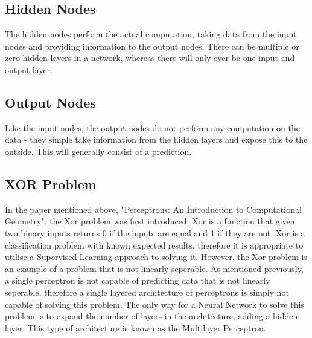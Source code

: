 \documentclass[12pt]{report}
\begin{document}
\subsection{Hidden Nodes}
\begin{flushleft}
The hidden nodes perform the actual computation, taking data from the input nodes and providing information to the output nodes. There can be multiple or zero hidden layers in a network, whereas there will only ever be one input and output layer.
\end{flushleft}

\subsection{Output Nodes}
\begin{flushleft}
Like the input nodes, the output nodes do not perform any computation on the data - they simple take information from the hidden layers and expose this to the outside. This will generally consist of a prediction.
\end{flushleft}

\subsection{XOR Problem}
\begin{flushleft}
In the paper mentioned above, "Perceptrons: An Introduction to Computational Geometry", the Xor problem was first introduced. Xor is a function that given two binary inputs returns 0 if the inputs are equal and 1 if they are not. Xor is a classification problem with known expected results, therefore it is appropriate to utilise a Supervised Learning approach to solving it. However, the Xor problem is an example of a problem that is not linearly seperable. As mentioned previously, a single perceptron is not capable of predicting data that is not linearly seperable, therefore a single layered architecture of perceptrons is simply not capable of solving this problem. The only way for a Neural Network to solve this problem is to expand the number of layers in the architecture, adding a hidden layer. This type of architecture is known as the Multilayer Perceptron.
\end{flushleft}
\end{document}
